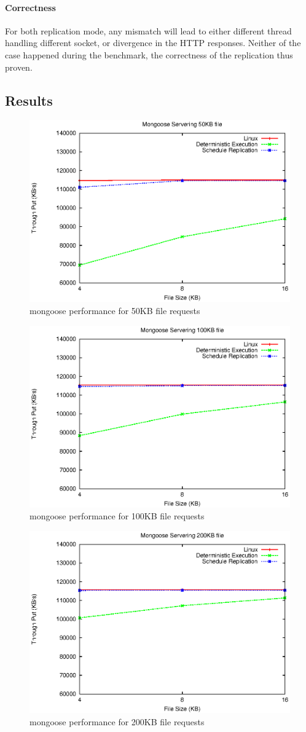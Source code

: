 \paragraph{Correctness} For both replication mode, any mismatch will lead to either different thread handling different socket, or divergence in the HTTP responses. Neither of the case happened during the benchmark, the correctness of the replication thus proven.

\subsection{Results}
\begin{figure}
\centering
\includegraphics[width=0.7\columnwidth]{figures/mg_throughput_50k}
\caption{mongoose performance for 50KB file requests}
\label{f:mg_50k}
\end{figure}
\begin{figure}
\centering
\includegraphics[width=0.7\columnwidth]{figures/mg_throughput_100k}
\caption{mongoose performance for 100KB file requests}
\label{f:mg_100k}
\end{figure}
\begin{figure}
\centering
\includegraphics[width=0.7\columnwidth]{figures/mg_throughput_200k}
\caption{mongoose performance for 200KB file requests}
\label{f:mg_200k}
\end{figure}

